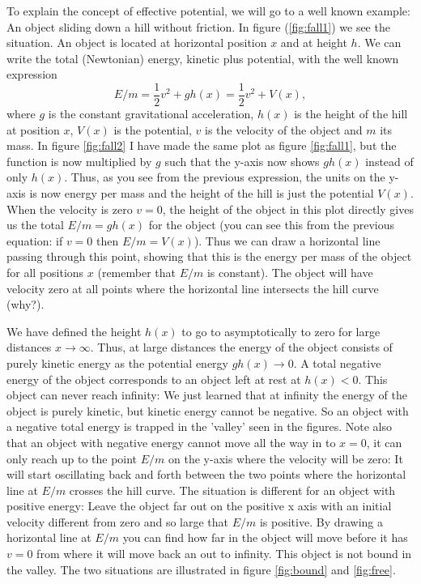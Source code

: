 \begin{multicols}{2}
To explain the concept of effective potential, we will go to a well known example: An object sliding down a hill without friction. In figure (\ref{fig:fall1}) we see the situation. An object is located at horizontal position $x$ and at height $h$. We can write the total (Newtonian) energy, kinetic plus potential, with the well known expression
\[
E/m=\frac{1}{2}v^2+gh(x)=\frac{1}{2}v^2+V(x),
\]
where $g$ is the constant gravitational acceleration, $h(x)$ is the height of the hill at position $x$,  $V(x)$ is the potential, $v$ is the velocity of the object and $m$ its mass. In figure \ref{fig:fall2} I have made the same plot as figure \ref{fig:fall1}, but the function is now multiplied by $g$ such that the y-axis now shows $gh(x)$ instead of only $h(x)$. Thus, as you see from the previous expression, the units on the y-axis is now energy per mass and the height of the hill is just the potential $V(x)$. When the velocity is zero $v=0$, the height of the object in this plot directly gives us the total $E/m=gh(x)$ for the object (you can see this from the previous equation: if $v=0$ then $E/m=V(x)$). Thus we can draw a horizontal line passing through this point, showing that this is the energy per mass of the object for all positions $x$ (remember that $E/m$ is constant). The object will have velocity zero at all points where the horizontal line intersects the hill curve (why?).

We have defined the height $h(x)$ to go to asymptotically to zero for large distances $x\rightarrow\infty$. Thus, at large distances the energy of the object consists of purely kinetic energy as the potential energy $gh(x)\rightarrow0$. A total negative energy of the object corresponds to an object left at rest at $h(x)<0$. This object can never reach infinity: We just learned that at infinity the energy of the object is purely kinetic, but kinetic energy cannot be negative. So an object with a negative total energy is trapped in the 'valley' seen in the figures. Note also that an object with negative energy cannot move all the way in to $x=0$, it can only reach up to the point $E/m$ on the y-axis where the velocity will be zero: It will start oscillating back and forth between the two points where the horizontal line at $E/m$ crosses the hill curve. The situation is different for an object with positive energy: Leave the object far out on the positive x axis with an initial velocity different from zero and so large that $E/m$ is positive. By drawing a horizontal line at $E/m$ you can find how far in the object will move before it has $v=0$ from where it will move back an out to infinity. This object is not bound in the valley. The two situations are illustrated in figure \ref{fig:bound} and \ref{fig:free}.


\end{multicols}
